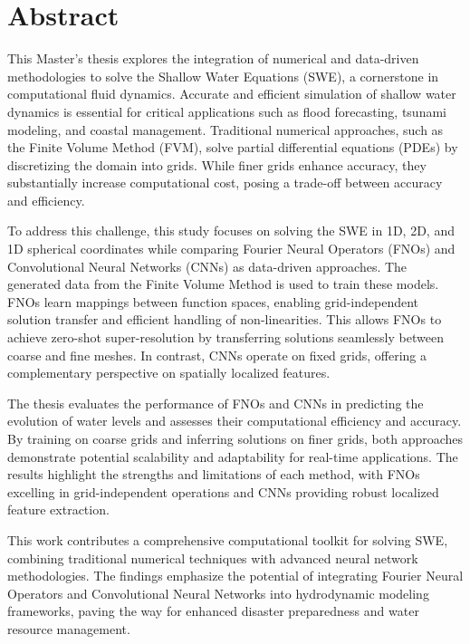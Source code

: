 \chapter*{Abstract}

This Master's thesis explores the integration of numerical and data-driven methodologies to solve the Shallow Water Equations (SWE), a cornerstone in computational fluid dynamics.
Accurate and efficient simulation of shallow water dynamics is essential for critical applications such as flood forecasting, tsunami modeling, and coastal management.
Traditional numerical approaches, such as the Finite Volume Method (FVM), solve partial differential equations (PDEs) by discretizing the domain into grids.
While finer grids enhance accuracy, they substantially increase computational cost, posing a trade-off between accuracy and efficiency.

\noindent To address this challenge, this study focuses on solving the SWE in 1D, 2D, and 1D spherical coordinates while comparing Fourier Neural Operators (FNOs) and Convolutional Neural Networks (CNNs) as data-driven approaches.
The generated data from the Finite Volume Method is used to train these models.
FNOs learn mappings between function spaces, enabling grid-independent solution transfer and efficient handling of non-linearities.
This allows FNOs to achieve zero-shot super-resolution by transferring solutions seamlessly between coarse and fine meshes.
In contrast, CNNs operate on fixed grids, offering a complementary perspective on spatially localized features.

\noindent The thesis evaluates the performance of FNOs and CNNs in predicting the evolution of water levels and assesses their computational efficiency and accuracy.
By training on coarse grids and inferring solutions on finer grids, both approaches demonstrate potential scalability and adaptability for real-time applications.
The results highlight the strengths and limitations of each method, with FNOs excelling in grid-independent operations and CNNs providing robust localized feature extraction.

\noindent This work contributes a comprehensive computational toolkit for solving SWE, combining traditional numerical techniques with advanced neural network methodologies.
The findings emphasize the potential of integrating Fourier Neural Operators and Convolutional Neural Networks into hydrodynamic modeling frameworks, paving the way for enhanced disaster preparedness and water resource management.





